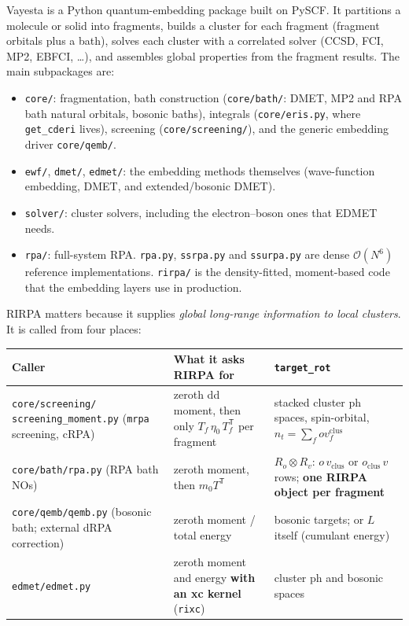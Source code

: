 \documentclass[11pt,a4paper]{article}
\newcommand{\code}[1]{\texttt{\small #1}}
\newcommand{\nt}{n_{t}}
\newcommand{\ov}{ov}
\begin{document}
Vayesta is a Python quantum-embedding package built on PySCF. It partitions a molecule or
solid into fragments, builds a cluster for each fragment (fragment orbitals plus a bath),
solves each cluster with a correlated solver (CCSD, FCI, MP2, EBFCI, \dots), and assembles
global properties from the fragment results. The main subpackages are:
\begin{itemize}
  \item \code{core/}: fragmentation, bath construction (\code{core/bath/}: DMET, MP2 and RPA
        bath natural orbitals, bosonic baths), integrals (\code{core/eris.py}, where
        \code{get\_cderi} lives), screening (\code{core/screening/}), and the generic embedding
        driver \code{core/qemb/}.
  \item \code{ewf/}, \code{dmet/}, \code{edmet/}: the embedding methods themselves
        (wave-function embedding, DMET, and extended/bosonic DMET).
  \item \code{solver/}: cluster solvers, including the electron--boson ones that EDMET needs.
  \item \code{rpa/}: full-system RPA. \code{rpa.py}, \code{ssrpa.py} and \code{ssurpa.py} are
        dense $\mathcal{O}(N^6)$ reference implementations. \code{rirpa/} is the
        density-fitted, moment-based code that the embedding layers use in production.
\end{itemize}

RIRPA matters because it supplies \emph{global long-range information to local clusters}.
It is called from four places:

\begin{center}
\small
\begin{tabularx}{\textwidth}{@{}>{\raggedright\arraybackslash}p{4.2cm}LL@{}}
\toprule
Caller & What it asks RIRPA for & \code{target\_rot} \\
\midrule
\code{core/screening/ screening\_moment.py} (\code{mrpa} screening, cRPA)
  & zeroth dd moment, then only $T_f\,\eta_0\,T_f^{\mathsf T}$ per fragment
  & stacked cluster ph spaces, spin-orbital, $\nt=\sum_f \ov_f^{\mathrm{clus}}$ \\
\code{core/bath/rpa.py} (RPA bath NOs)
  & zeroth moment, then $m_0 T^{\mathsf T}$
  & $R_o\otimes R_v$: $o\,v_{\mathrm{clus}}$ or $o_{\mathrm{clus}}\,v$ rows; \textbf{one RIRPA object per fragment} \\
\code{core/qemb/qemb.py} (bosonic bath; external dRPA correction)
  & zeroth moment / total energy
  & bosonic targets; or $L$ itself (cumulant energy) \\
\code{edmet/edmet.py}
  & zeroth moment and energy \textbf{with an xc kernel} (\code{rixc})
  & cluster ph and bosonic spaces \\
\bottomrule
\end{tabularx}
\end{center}
\end{document}
